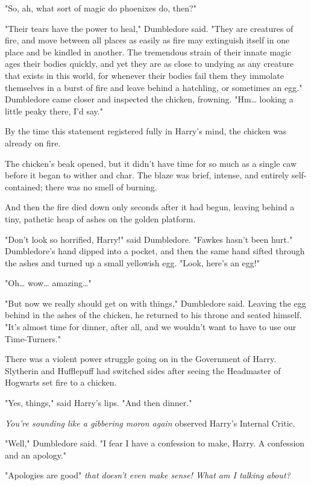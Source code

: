 "So, ah, what sort of magic do phoenixes do, then?"

"Their tears have the power to heal," Dumbledore said. "They are creatures of
fire, and move between all places as easily as fire may extinguish itself in
one place and be kindled in another. The tremendous strain of their innate
magic ages their bodies quickly, and yet they are as close to undying as any
creature that exists in this world, for whenever their bodies fail them they
immolate themselves in a burst of fire and leave behind a hatchling, or
sometimes an egg." Dumbledore came closer and inspected the chicken, frowning.
"Hm{\ldots} looking a little peaky there, I'd say."

By the time this statement registered fully in Harry's mind, the chicken was
already on fire.

The chicken's beak opened, but it didn't have time for so much as a single caw
before it began to wither and char. The blaze was brief, intense, and entirely
self-contained; there was no smell of burning.

And then the fire died down only seconds after it had begun, leaving behind a
tiny, pathetic heap of ashes on the golden platform.

"Don't look so horrified, Harry!" said Dumbledore. "Fawkes hasn't been hurt."
Dumbledore's hand dipped into a pocket, and then the same hand sifted through
the ashes and turned up a small yellowish egg. "Look, here's an egg!"

"Oh{\ldots} wow{\ldots} amazing{\ldots}"

"But now we really should get on with things," Dumbledore said. Leaving the egg
behind in the ashes of the chicken, he returned to his throne and seated
himself. "It's almost time for dinner, after all, and we wouldn't want to have
to use our Time-Turners."

There was a violent power struggle going on in the Government of Harry.
Slytherin and Hufflepuff had switched sides after seeing the Headmaster of
Hogwarts set fire to a chicken.

"Yes, things," said Harry's lips. "And then dinner."

\emph{You're sounding like a gibbering moron again} observed Harry's Internal
Critic.

"Well," Dumbledore said. "I fear I have a confession to make, Harry. A
confession and an apology."

"Apologies are good" \emph{that doesn't even make sense! What am I talking
about?}


